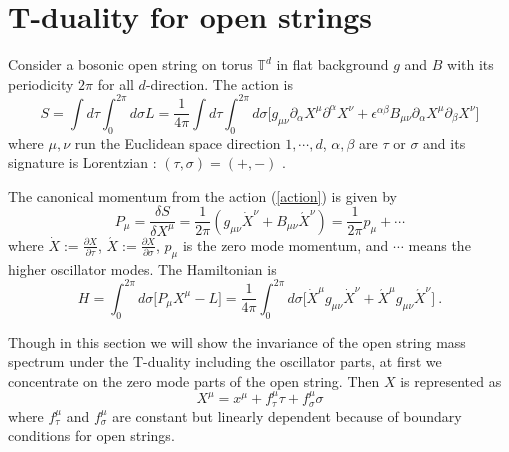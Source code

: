 \documentclass[a4paper,12pt]{article}
\newcommand{\T}{{\mathbb{T}}}
\def \Xd{{\dot X}}
\def \Xa{{\acute X}}
\def \ov#1{\frac{1}{#1}}
\def \fpart#1#2{\frac{\partial #1}{\partial #2}}
\def \fdel#1#2{\frac{\delta {#1}}{\delta {#2}}}
\begin{document}
%

 \section{T-duality for open strings}
\label{sec:2}

Consider a bosonic open string on torus $\T^d$ in flat background 
$g$ and $B$ with its periodicity $2\pi$ 
for all $d$-direction. The action is  
\begin{equation}
 S=\int d\tau\int_0^{2\pi} d\sigma L
 =\ov{4\pi}\int d\tau\int_0^{2\pi} d\sigma 
 \Big[g_{\mu\nu}\partial_\alpha X^\mu\partial^\alpha X^\nu
     +\epsilon^{\alpha\beta} 
      B_{\mu\nu}\partial_\alpha X^\mu\partial_\beta X^\nu \Big]
\label{action}
\end{equation}
where $\mu, \nu$ run the Euclidean space direction $1,\cdots, d$,  
$\alpha, \beta$ are $\tau$ or $\sigma$ and its signature is Lorentzian : 
$(\tau, \sigma)=(+,-)$ .

The canonical momentum from the action (\ref{action}) is given by 
\begin{equation}
 P_\mu=\fdel{S}{X^\mu}=\ov{2\pi}
 \left(g_{\mu\nu}\Xd^\nu+B_{\mu\nu}\Xa^\nu\right)=\ov{2\pi}p_\mu+\cdots
 \label{mom}
\end{equation}
where $\Xd:=\fpart{X}{\tau}$, $\Xa:=\fpart{X}{\sigma}$, 
$p_\mu$ is the zero mode momentum, and $\cdots$ means 
the higher oscillator modes.
The Hamiltonian is 
\begin{equation}
 H=\int_0^{2\pi}d\sigma \big[P_\mu X^\mu-L\big]
  =\ov{4\pi}\int_0^{2\pi}d\sigma
 \big[\Xd^\mu g_{\mu\nu}\Xd^\nu+\Xa^\mu g_{\mu\nu}\Xa^\nu\big]\ .
 \label{H}
\end{equation}

Though in this section we will show the invariance of the open string 
mass spectrum under the T-duality including the oscillator parts, 
at first we concentrate on the zero mode parts of the open string. 
Then $X$ is represented as 
\begin{equation}
 X^\mu=x^\mu+f_\tau^\mu\tau+f_\sigma^\mu\sigma
 \label{zero}
\end{equation}
where $f_\tau^\mu$ and $f_\sigma^\mu$ are constant but linearly dependent 
because of boundary conditions for open strings. 
\end{document}
